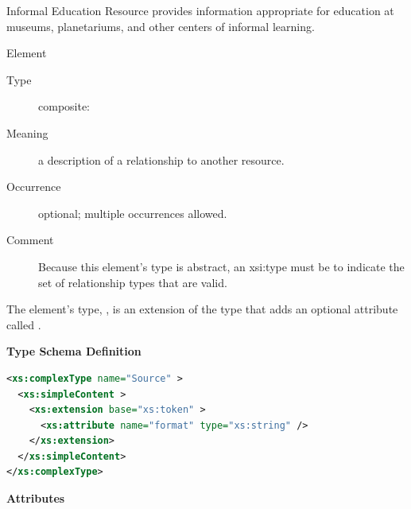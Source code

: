 \documentclass[11pt,a4paper]{ivoa}
\begin{document}
\begin{bigdescription}
\begin{description}
\begin{longtermsdescription}
\item[Informal Education]
               Resource provides information appropriate for education
               at museums, planetariums, and other centers of informal learning.
             
\end{longtermsdescription}

\end{description}
\item[Element \xmlel{relationship}]
\begin{description}
\item[Type] composite: 
\item[Meaning] 
               a description of a relationship to another resource.  
             
\item[Occurrence] optional; multiple occurrences allowed.
\item[Comment] 
                Because this element's type is abstract, an xsi:type must be 
                to indicate the set of relationship types that are valid.
             

\end{description}


\end{bigdescription}\endgroup

\endgroup



The  element's type,
, is an extension of the
 type that adds an optional attribute called
.  


\begingroup
      	\renewcommand*\descriptionlabel[1]{%
      	\hbox to 5.5em{\emph{#1}\hfil}}\vspace{1ex}\noindent\textbf{ Type Schema Definition}

\begin{lstlisting}[language=XML,basicstyle=\footnotesize]
<xs:complexType name="Source" >
  <xs:simpleContent >
    <xs:extension base="xs:token" >
      <xs:attribute name="format" type="xs:string" />
    </xs:extension>
  </xs:simpleContent>
</xs:complexType>
\end{lstlisting}

\vspace{0.5ex}\noindent\textbf{ Attributes}
\end{document}
